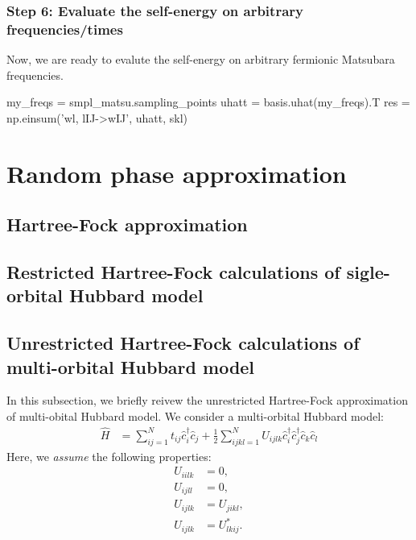 \documentclass[submission, LectureNotes]{SciPost}
\newcommand{\wmax}{\ensuremath{{\omega_\mathrm{max}}}}
\newcommand\ii{\mathrm{i}}%
\newcommand{\hatFmat}{\hat{\mathbf{F}}}
\newcommand{\Fmat}{{\mathbf{F}}}
\begin{document}
\subsubsection*{Step 6: Evaluate the self-energy on arbitrary frequencies/times}
Now, we are ready to evalute the self-energy on arbitrary fermionic Matsubara frequencies.
\begin{python}
my_freqs = smpl_matsu.sampling_points
uhatt = basis.uhat(my_freqs).T
res = np.einsum('wl, lIJ->wIJ', uhatt, skl)
\end{python}


%
%
%

\clearpage
\section{Random phase approximation}
\subsection{Hartree-Fock approximation}
\clearpage
\subsection{Restricted Hartree-Fock calculations of sigle-orbital Hubbard model}

\clearpage
\subsection{Unrestricted Hartree-Fock calculations of multi-orbital Hubbard model}
In this subsection, we briefly reivew the unrestricted Hartree-Fock approximation of multi-obital Hubbard model.
We consider a multi-orbital Hubbard model:
\begin{align}
    \hat{H} &= \sum_{ij=1}^N t_{ij} \hat{c}^\dagger_i \hat{c}_j + \frac{1}{2} \sum_{ijkl=1}^N U_{ijlk}\hat{c}^\dagger_i \hat{c}^\dagger_j \hat{c}_k \hat{c}_l
\end{align}
Here, we \textit{assume} the following properties:
\begin{align}
U_{iilk} &= 0,\label{eq:U-prop-start}\\
U_{ijll} &= 0,\\
U_{ijlk} &= U_{jikl}, \\
U_{ijlk} &= U_{lkij}^*.\label{eq:U-prop-end}
\end{align}
\end{document}
